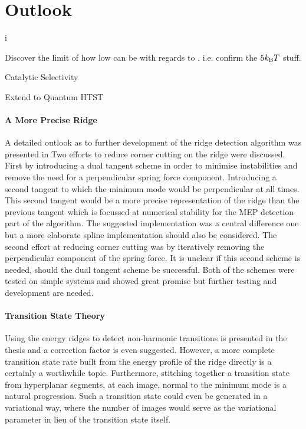 \section{Outlook}
\label{sec:summary-outlook}

\bit
i%
\item Discover the limit of how low  can be with regards to . i.e. confirm the $5k_\text{B} T$ stuff.
\item Catalytic Selectivity
\item Extend to Quantum HTST
\eit

\paragraph{A More Precise Ridge}
A detailed outlook as to further development of the ridge detection algorithm was presented in 
Two efforts to reduce corner cutting on the ridge were discussed.
First by introducing a dual tangent scheme in order to minimise instabilities and remove the need for a perpendicular spring force component.
Introducing a second tangent to which the minimum mode would be perpendicular at all times.
This second tangent would be a more precise representation of the ridge than the previous tangent which is focussed at numerical stability for the MEP detection part of the algorithm.
The suggested implementation was a central difference one but a more elaborate spline implementation should also be considered.
The second effort at reducing corner cutting was by iteratively removing the perpendicular component of the spring force.
It is unclear if this second scheme is needed, should the dual tangent scheme be successful.
Both of the schemes were tested on simple systems and showed great promise but further testing and development are needed.

\paragraph{Transition State Theory}
Using the energy ridges to detect non-harmonic transitions is presented in the thesis and a correction factor is even suggested.
However, a more complete transition state rate built from the energy profile of the ridge directly is a certainly a worthwhile topic.
Furthermore, stitching together a transition state from hyperplanar segments, at each image, normal to the minimum mode is a natural progression.
Such a transition state could even be generated in a variational way, where the number of images would serve as the variational parameter in lieu of the transition state itself.

